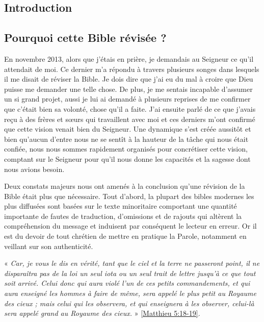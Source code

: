 \begin{center}{\LARGE \section*{Introduction}}\end{center}
\begin{small}
\subsection*{Pourquoi cette Bible révisée ?}

En novembre 2013, alors que j'étais en prière, je demandais au Seigneur ce qu'il attendait de moi. Ce dernier m'a répondu à travers plusieurs songes dans lesquels il me disait de réviser la Bible. Je dois dire que j'ai eu du mal à croire que Dieu puisse me demander une telle chose. De plus, je me sentais incapable d'assumer un si grand projet, aussi je lui ai demandé à plusieurs reprises de me confirmer que c'était bien sa volonté, chose qu'il a faite. J'ai ensuite parlé de ce que j'avais reçu à des frères et sœurs qui travaillent avec moi et ces derniers m'ont confirmé que cette vision venait bien du Seigneur. Une dynamique s'est créée aussitôt et bien qu'aucun d'entre nous ne se sentît à la hauteur de la tâche qui nous était confiée, nous nous sommes rapidement organisés pour concrétiser cette vision, comptant sur le Seigneur pour qu'il nous donne les capacités et la sagesse dont nous avions besoin. 

Deux constats majeurs nous ont amenés à la conclusion qu'une révision de la Bible était plus que nécessaire. Tout d'abord, la plupart des bibles modernes les plus diffusées sont basées sur le texte minoritaire comportant une quantité importante de fautes de traduction, d'omissions et de rajouts qui altèrent la compréhension du message et induisent par conséquent le lecteur en erreur. Or il est du devoir de tout chrétien de mettre en pratique la Parole, notamment en veillant sur son authenticité.

« \emph{Car, je vous le dis en vérité, tant que le ciel et la terre ne passeront point, il ne disparaîtra pas de la loi un seul iota ou un seul trait de lettre jusqu'à ce que tout soit arrivé. Celui donc qui aura violé l'un de ces petits commandements, et qui aura enseigné les hommes à faire de même, sera appelé le plus petit au Royaume des cieux ; mais celui qui les observera, et qui enseignera à les observer, celui-là sera appelé grand au Royaume des cieux.} » \vref{Matthieu 5:18-19}.


\end{small}
